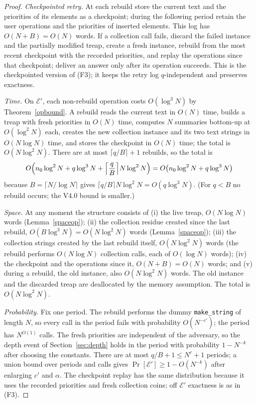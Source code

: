 ﻿\documentclass[11pt]{article}
\theoremstyle{plain}
\theoremstyle{remark}
\begin{document}
\begin{proof}
\emph{Checkpointed retry.} At each rebuild store the current text and the priorities of its elements as a checkpoint; during the following period retain the user operations and the priorities of inserted elements. This log has $O(N+B)=O(N)$ words. If a collection call fails, discard the failed instance and the partially modified treap, create a fresh instance, rebuild from the most recent checkpoint with the recorded priorities, and replay the operations since that checkpoint; deliver an answer only after its operation succeeds. This is the checkpointed version of (F3); it keeps the retry log $q$-independent and preserves exactness.

\emph{Time.} On $\mathcal E'$, each non-rebuild operation costs $O(\log^3N)$ by Theorem~\ref{opbound}. A rebuild reads the current text in $O(N)$ time, builds a treap with fresh priorities in $O(N)$ time, computes $N$ summaries bottom-up at $O(\log^2N)$ each, creates the new collection instance and its two text strings in $O(N\log N)$ time, and stores the checkpoint in $O(N)$ time; the total is $O(N\log^2N)$. There are at most $\lceil q/B\rceil+1$ rebuilds, so the total is
\[
O\Bigl(n_0\log^2N+q\log^3N+\Bigl\lceil\frac{q}{B}\Bigr\rceil N\log^2N\Bigr)
=O\bigl(n_0\log^2N+q\log^3N\bigr)
\]
because $B=\lceil N/\log N\rceil$ gives $\lceil q/B\rceil N\log^2N=O(q\log^3N)$. (For $q<B$ no rebuild occurs; the V4.0 bound is smaller.)

\emph{Space.} At any moment the structure consists of (i) the live treap, $O(N\log N)$ words (Lemma~\ref{spaceop}); (ii) the collection residue created since the last rebuild, $O(B\log^3N)=O(N\log^2N)$ words (Lemma~\ref{spaceop}); (iii) the collection strings created by the last rebuild itself, $O(N\log^2N)$ words (the rebuild performs $O(N\log N)$ collection calls, each of $O(\log N)$ words); (iv) the checkpoint and the operations since it, $O(N+B)=O(N)$ words; and (v) during a rebuild, the old instance, also $O(N\log^2N)$ words. The old instance and the discarded treap are deallocated by the memory assumption. The total is $O(N\log^2N)$.

\emph{Probability.} Fix one period. The rebuild performs the dummy \texttt{make\_string} of length $N$, so every call in the period fails with probability $O(N^{-c'})$; the period has $N^{O(1)}$ calls. The fresh priorities are independent of the adversary, so the depth event of Section~\ref{sec:depth} holds in the period with probability $1-N^{-k}$ after choosing the constants. There are at most $q/B+1\le N^c+1$ periods; a union bound over periods and calls gives $\Pr[\mathcal E']\ge1-O(N^{-k})$ after enlarging $c'$ and $\alpha$. The checkpoint replay has the same distribution because it uses the recorded priorities and fresh collection coins; off $\mathcal E'$ exactness is as in (F3).
\end{proof}
\end{document}

